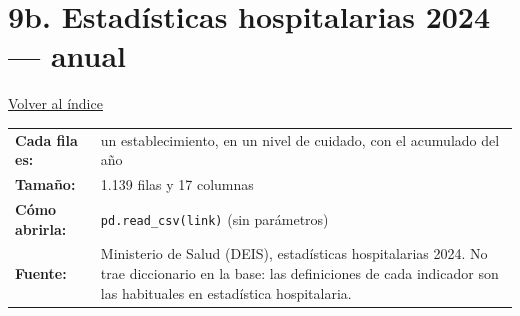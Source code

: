 \documentclass[10.5pt]{article}
\begin{document}
\section*{9b. Estadísticas hospitalarias 2024 --- anual}
\vspace{-6pt}\hfill{\small\hyperlink{indice}{\textcolor{azuloscuro}{\underline{Volver al índice}}}}\par\vspace{2pt}
\begin{tabularx}{\linewidth}{@{}l X@{}}\textbf{Cada fila es:} & un establecimiento, en un nivel de cuidado, con el acumulado del año \\\textbf{Tamaño:} & 1.139 filas y 17 columnas \\\textbf{Cómo abrirla:} & \texttt{pd.read\_\allowbreak{}csv(link)} (sin parámetros) \\\textbf{Fuente:} & Ministerio de Salud (DEIS), estadísticas hospitalarias 2024. No trae diccionario en la base: las definiciones de cada indicador son las habituales en estadística hospitalaria. \\\end{tabularx}
\vspace{6pt}
\end{document}
